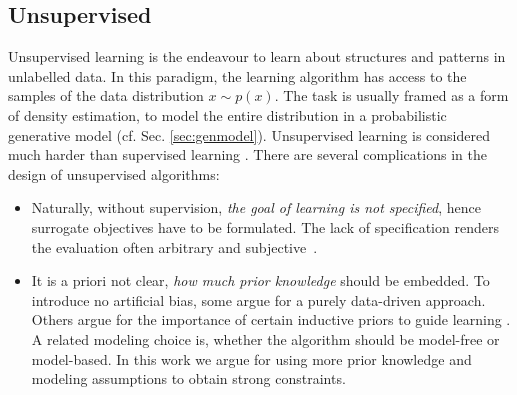 	\subsection{Unsupervised}\label{sec:unsupervised}
		{Unsupervised learning} is the endeavour to learn about structures and patterns in unlabelled data. In this paradigm, the learning algorithm has access to the samples of the data distribution $x \sim p(x)$. The task is usually framed as a form of density estimation, \ie to model the entire distribution in a probabilistic generative model (cf. Sec. \ref{sec:genmodel}).
		Unsupervised learning is considered much harder than supervised learning \cite{bishop06pattern}. There are several complications in the design of unsupervised algorithms:
		\begin{itemize}
			\item Naturally, without supervision, \textit{the goal of learning is not specified}, hence surrogate objectives have to be formulated. The lack of specification renders the evaluation often arbitrary and subjective~\cite{theis15evalgen}.
			\item It is a priori not clear, \textit{how much prior knowledge} should be embedded. To introduce no artificial bias, some argue for a purely data-driven approach. Others argue for the importance of certain inductive priors to guide learning \cite{tenenbaum18think}.
			A related modeling choice is, whether the algorithm should be model-free or model-based.
			{In this work we argue for using more prior knowledge and modeling assumptions to obtain strong constraints.}

		\end{itemize}

